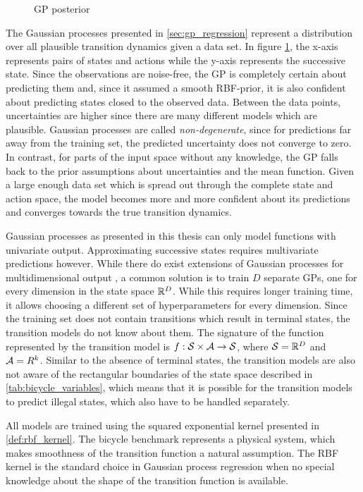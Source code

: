 \begin{figure}[tb]
    \centering
    \caption{GP posterior}
    \label{fig:gp_transition_models}
\end{figure}
The Gaussian processes presented in \cref{sec:gp_regression} represent a distribution over all plausible transition dynamics given a data set.
In figure \cref{fig:gp_transition_models}, the x-axis represents pairs of states and actions while the y-axis represents the successive state.
Since the observations are noise-free, the GP is completely certain about predicting them and, since it assumed a smooth RBF-prior, it is also confident about predicting states closed to the observed data.
Between the data points, uncertainties are higher since there are many different models which are plausible.
Gaussian processes are called \emph{non-degenerate}, since for predictions far away from the training set, the predicted uncertainty does not converge to zero.
In contrast, for parts of the input space without any knowledge, the GP falls back to the prior assumptions about uncertainties and the mean function.
Given a large enough data set which is spread out through the complete state and action space, the model becomes more and more confident about its predictions and converges towards the true transition dynamics.

Gaussian processes as presented in this thesis can only model functions with univariate output.
Approximating successive states requires multivariate predictions however.
While there do exist extensions of Gaussian processes for multidimensional output \cite{rasmussen_gaussian_2006}, a common solution is to train $D$ separate GPs, one for every dimension in the state space $\mathbb{R}^D$.
While this requires longer training time, it allows choosing a different set of hyperparameters for every dimension.
Since the training set does not contain transitions which result in terminal states, the transition models do not know about them.
The signature of the function represented by the transition model is $f : \mathcal{S} \times \mathcal{A} \to \mathcal{S}$, where $\mathcal{S} = \mathbb{R}^D$ and $\mathcal{A} = R^k$.
Similar to the absence of terminal states, the transition models are also not aware of the rectangular boundaries of the state space described in \cref{tab:bicycle_variables}, which means that it is possible for the transition models to predict illegal states, which also have to be handled separately.

All models are trained using the squared exponential kernel presented in \cref{def:rbf_kernel}.
The bicycle benchmark represents a physical system, which makes smoothness of the transition function a natural assumption.
The RBF kernel is the standard choice in Gaussian process regression when no special knowledge about the shape of the transition function is available.

